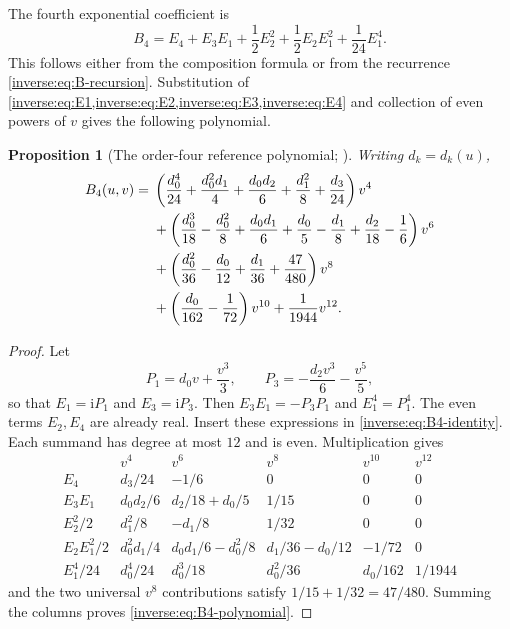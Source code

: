 \documentclass[11pt,oneside]{article}
\newtheorem{proposition}[proposition]{Proposition}
\theoremstyle{definition}
\theoremstyle{remark}
\newcommand{\ii}{\mathrm i}
\begin{document}
The fourth exponential coefficient is
\begin{equation}
 B_4
 =E_4+E_3E_1+\frac12E_2^2
   +\frac12E_2E_1^2+\frac1{24}E_1^4.
 \label{inverse:eq:B4-identity}
\end{equation}
This follows either from the composition formula or from the recurrence
\eqref{inverse:eq:B-recursion}.  Substitution of
\cref{inverse:eq:E1,inverse:eq:E2,inverse:eq:E3,inverse:eq:E4} and collection of even powers of $v$
gives the following polynomial.

\begin{proposition}[The order-four reference polynomial; \Formalized]
\label{inverse:prop:B4-polynomial}
Writing $d_k=d_k(u)$,
\begin{align}
 B_4(u,v)={}&
 \left(\frac{d_0^4}{24}+\frac{d_0^2d_1}{4}
       +\frac{d_0d_2}{6}+\frac{d_1^2}{8}
       +\frac{d_3}{24}\right)v^4 \notag\\
 &+\left(\frac{d_0^3}{18}-\frac{d_0^2}{8}
       +\frac{d_0d_1}{6}+\frac{d_0}{5}
       -\frac{d_1}{8}+\frac{d_2}{18}
       -\frac16\right)v^6 \notag\\
 &+\left(\frac{d_0^2}{36}-\frac{d_0}{12}
       +\frac{d_1}{36}+\frac{47}{480}\right)v^8 \notag\\
 &+\left(\frac{d_0}{162}-\frac1{72}\right)v^{10}
   +\frac1{1944}v^{12}. \label{inverse:eq:B4-polynomial}
\end{align}
\end{proposition}

\begin{proof}
Let
\[
 P_1=d_0v+\frac{v^3}{3},\qquad
 P_3=-\frac{d_2v^3}{6}-\frac{v^5}{5},
\]
so that $E_1=\ii P_1$ and $E_3=\ii P_3$.  Then
$E_3E_1=-P_3P_1$ and $E_1^4=P_1^4$.  The even terms $E_2,E_4$ are already
real.  Insert these expressions in \eqref{inverse:eq:B4-identity}.  Each summand
has degree at most $12$ and is even.  Multiplication gives
\[
\begin{array}{c|ccccc}
 &v^4&v^6&v^8&v^{10}&v^{12}\\
\hline
E_4&
 d_3/24&-1/6&0&0&0\\
E_3E_1&
 d_0d_2/6&d_2/18+d_0/5&1/15&0&0\\
E_2^2/2&
 d_1^2/8&-d_1/8&1/32&0&0\\
E_2E_1^2/2&
 d_0^2d_1/4&
 d_0d_1/6-d_0^2/8&
 d_1/36-d_0/12&
 -1/72&0\\
E_1^4/24&
 d_0^4/24&d_0^3/18&d_0^2/36&d_0/162&1/1944
\end{array}
\]
and the two universal $v^8$ contributions satisfy
$1/15+1/32=47/480$.  Summing the columns proves
\eqref{inverse:eq:B4-polynomial}.
\end{proof}
\end{document}
